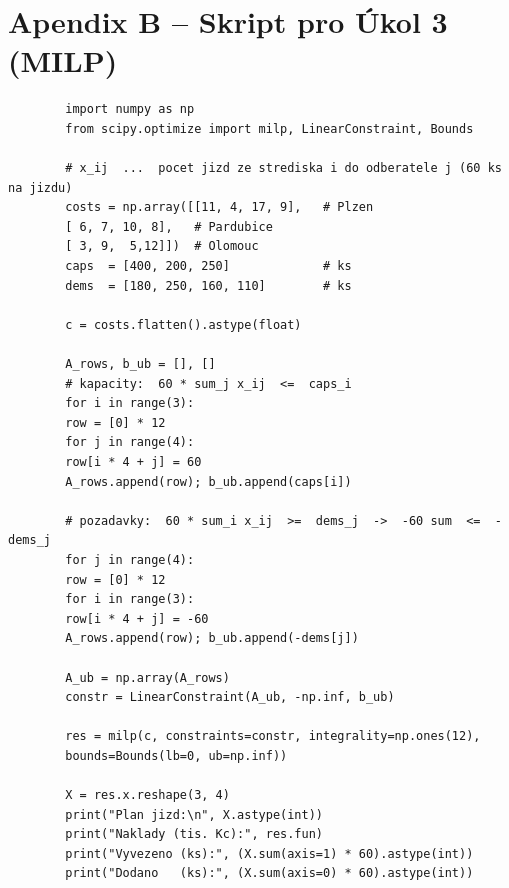 \documentclass[11pt,a4paper]{article}
\begin{document}
	\section*{Apendix B -- Skript pro Úkol 3 (MILP)}
	\begin{lstlisting}
		import numpy as np
		from scipy.optimize import milp, LinearConstraint, Bounds
		
		# x_ij  ...  pocet jizd ze strediska i do odberatele j (60 ks na jizdu)
		costs = np.array([[11, 4, 17, 9],   # Plzen
		[ 6, 7, 10, 8],   # Pardubice
		[ 3, 9,  5,12]])  # Olomouc
		caps  = [400, 200, 250]             # ks
		dems  = [180, 250, 160, 110]        # ks
		
		c = costs.flatten().astype(float)
		
		A_rows, b_ub = [], []
		# kapacity:  60 * sum_j x_ij  <=  caps_i
		for i in range(3):
		row = [0] * 12
		for j in range(4):
		row[i * 4 + j] = 60
		A_rows.append(row); b_ub.append(caps[i])
		
		# pozadavky:  60 * sum_i x_ij  >=  dems_j  ->  -60 sum  <=  -dems_j
		for j in range(4):
		row = [0] * 12
		for i in range(3):
		row[i * 4 + j] = -60
		A_rows.append(row); b_ub.append(-dems[j])
		
		A_ub = np.array(A_rows)
		constr = LinearConstraint(A_ub, -np.inf, b_ub)
		
		res = milp(c, constraints=constr, integrality=np.ones(12),
		bounds=Bounds(lb=0, ub=np.inf))
		
		X = res.x.reshape(3, 4)
		print("Plan jizd:\n", X.astype(int))
		print("Naklady (tis. Kc):", res.fun)
		print("Vyvezeno (ks):", (X.sum(axis=1) * 60).astype(int))
		print("Dodano   (ks):", (X.sum(axis=0) * 60).astype(int))
	\end{lstlisting}
	
\end{document}
